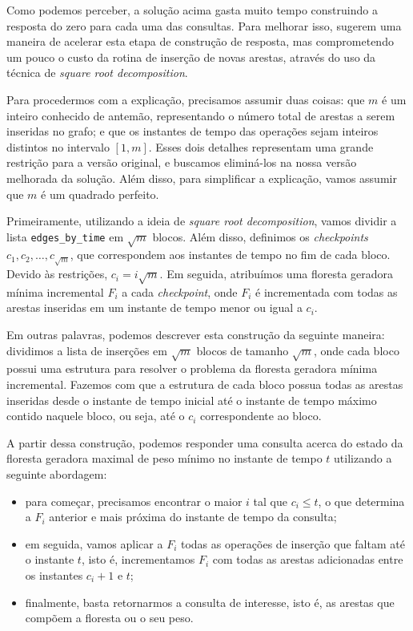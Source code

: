 Como podemos perceber, a solução acima gasta muito tempo construindo a resposta do zero para cada uma das consultas. Para melhorar isso, \citet{10.1093/comjnl/bxaa135} sugerem uma maneira de acelerar esta etapa de construção de resposta, mas comprometendo um pouco o custo da rotina de inserção de novas arestas, através do uso da técnica de \emph{square root decomposition}.

Para procedermos com a explicação, precisamos assumir duas coisas: que $m$ é um inteiro conhecido de antemão, representando o número total de arestas a serem inseridas no grafo; e que os instantes de tempo das operações sejam inteiros distintos no intervalo $[1,m]$. Esses dois detalhes representam uma grande restrição para a versão original, e buscamos eliminá-los na nossa versão melhorada da solução. Além disso, para simplificar a explicação, vamos assumir que $m$ é um quadrado perfeito.

Primeiramente, utilizando a ideia de \emph{square root decomposition}, vamos dividir a lista \texttt{edges\_by\_time} em $\sqrt{m}$ blocos. Além disso, definimos os \emph{checkpoints} $c_1, c_2, \dots, c_{\sqrt{m}}$, que correspondem aos instantes de tempo no fim de cada bloco. Devido às restrições, $c_i = i \sqrt{m}$. Em seguida, atribuímos uma floresta geradora mínima incremental $F_i$ a cada \emph{checkpoint}, onde $F_i$ é incrementada com todas as arestas inseridas em um instante de tempo menor ou igual a $c_i$.

Em outras palavras, podemos descrever esta construção da seguinte maneira: dividimos a lista de inserções em $\sqrt{m}$ blocos de tamanho $\sqrt{m}$, onde cada bloco possui uma estrutura para resolver o problema da floresta geradora mínima incremental. Fazemos com que a estrutura de cada bloco possua todas as arestas inseridas desde o instante de tempo inicial até o instante de tempo máximo contido naquele bloco, ou seja, até o $c_i$ correspondente ao bloco.

A partir dessa construção, podemos responder uma consulta acerca do estado da floresta geradora maximal de peso mínimo no instante de tempo $t$ utilizando a seguinte abordagem:

\begin{itemize}
    \item para começar, precisamos encontrar o maior $i$ tal que $c_i \leq t$, o que determina a $F_i$ anterior e mais próxima do instante de tempo da consulta;
    \item em seguida, vamos aplicar a $F_i$ todas as operações de inserção que faltam até o instante $t$, isto é, incrementamos $F_i$ com todas as arestas adicionadas entre os instantes $c_i + 1$ e $t$;
    \item finalmente, basta retornarmos a consulta de interesse, isto é, as arestas que compõem a floresta ou o seu peso.
\end{itemize}

